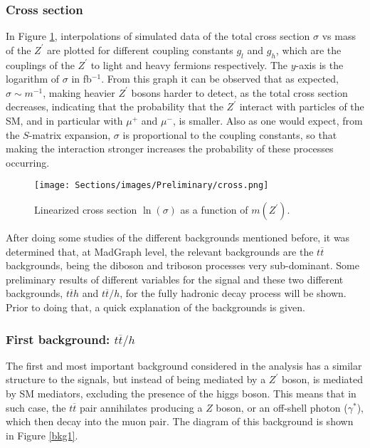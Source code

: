 \subsubsection{Cross section}

In Figure \ref{cross}, interpolations of simulated data of the total cross section $\sigma$ vs mass of the $Z^{\prime}$ are plotted for different coupling constants $g_l$ and $g_h$, which are the couplings of the $Z^{\prime}$ to light and heavy fermions respectively. The $y$-axis is the logarithm of $\sigma$ in fb$^{-1}$. From this graph it can be observed that as expected, $\sigma \sim m^{-1}$, making heavier $Z^{\prime}$ bosons harder to detect, as the total cross section decreases, indicating that the probability that the $Z^{\prime}$ interact with particles of the SM, and in particular with $\mu^+$ and $\mu^-$, is smaller. Also as one would expect, from the $S$-matrix expansion, $\sigma$ is proportional to the coupling constants, so that making the interaction stronger increases the probability of these processes occurring.

\begin{figure}[ht]
    \centering
    \texttt{[image: Sections/images/Preliminary/cross.png]}
    \caption{Linearized cross section $\ln(\sigma)$ as a function of $m(Z^{\prime})$.}
    \label{cross}
\end{figure}

After doing some studies of the different backgrounds mentioned before, it was determined that, at MadGraph level, the relevant backgrounds are the $t\overline t$ backgrounds, being the diboson and triboson processes very sub-dominant. Some preliminary results of different variables for the signal and these two different backgrounds, $t\overline th$ and $t\overline t/h$, for the fully hadronic decay process will be shown. Prior to doing that, a quick explanation of the backgrounds is given.

\subsubsection{First background: $t\overline t/h$} \label{ssec:firstbkg}

The first and most important background considered in the analysis has a similar structure to the signals, but instead of being mediated by a $Z^{\prime}$ boson, is mediated by SM mediators, excluding the presence of the higgs boson. This means that in such case, the $t\overline t$ pair annihilates producing a $Z$ boson, or an off-shell photon ($\gamma^*$), which then decay into the muon pair. The diagram of this background is shown in Figure \ref{bkg1}.

